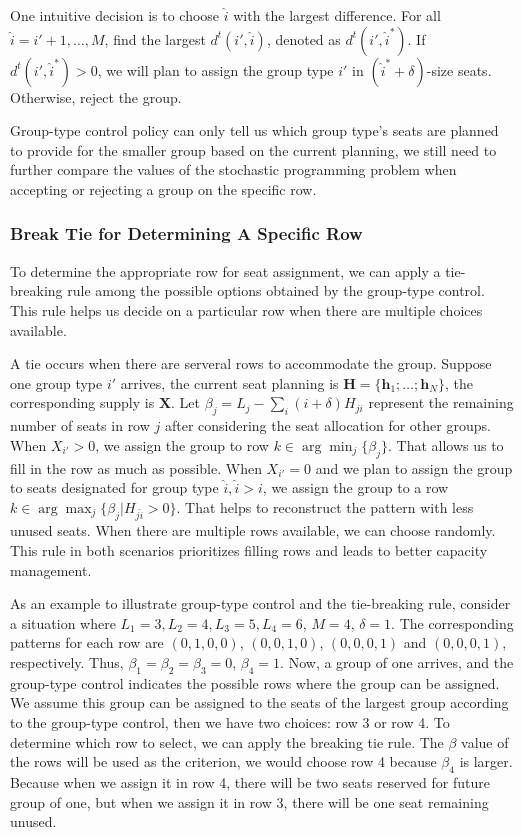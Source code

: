 One intuitive decision is to choose $\hat{i}$ with the largest difference. For all $\hat{i} = {i{'}}+1, \ldots, M$, find the largest $d^{t}({i{'}},\hat{i})$, denoted as $d^{t}({i{'}},\hat{i}^{*})$. If $d^{t}({i{'}},\hat{i}^{*}) >0$, we will plan to assign the group type ${i{'}}$ in $(\hat{i}^{*}+\delta)$-size seats. Otherwise, reject the group.

Group-type control policy can only tell us which group type's seats are planned to provide for the smaller group based on the current planning, we still need to further compare the values of the stochastic programming problem when accepting or rejecting a group on the specific row. 

\subsubsection{Break Tie for Determining A Specific Row}\label{tie-break}
To determine the appropriate row for seat assignment, we can apply a tie-breaking rule among the possible options obtained by the group-type control. This rule helps us decide on a particular row when there are multiple choices available.

A tie occurs when there are serveral rows to accommodate the group. Suppose one group type ${i{'}}$ arrives, the current seat planning is $\bm{H} = \{\bm{h}_{1}; \ldots; \bm{h}_{N}\}$, the corresponding supply is $\bm{X}$. Let $\beta_{j} = L_j - \sum_{i} (i+\delta) H_{ji}$ represent the remaining number of seats in row $j$ after considering the seat allocation for other groups. When $X_{{i{'}}} > 0$, we assign the group to row $k \in \arg \min_{j} \{\beta_{j}\}$. That allows us to fill in the row as much as possible. When $X_{{i{'}}} = 0$ and we plan to assign the group to seats designated for group type $\hat{i}, \hat{i}>i$, we assign the group to a row $k \in \arg \max_{j} \{\beta_{j}| H_{j \hat{i}}>0\}$. That helps to reconstruct the pattern with less unused seats. When there are multiple rows available, we can choose randomly. This rule in both scenarios prioritizes filling rows and leads to better capacity management.

As an example to illustrate group-type control and the tie-breaking rule, consider a situation where $L_1 =3, L_2 = 4, L_3 =5, L_4 =6$, $M =4$, $\delta =1$. The corresponding patterns for each row are $(0,1,0,0)$, $(0,0,1,0)$, $(0,0,0,1)$ and $(0,0,0,1)$, respectively. Thus, $\beta_1 = \beta_2 = \beta_3 =0$, $\beta_4 =1$. Now, a group of one arrives, and the group-type control indicates the possible rows where the group can be assigned. We assume this group can be assigned to the seats of the largest group according to the group-type control, then we have two choices: row 3 or row 4. To determine which row to select, we can apply the breaking tie rule. The $\beta$ value of the rows will be used as the criterion, we would choose row 4 because $\beta_4$ is larger. Because when we assign it in row 4, there will be two seats reserved for future group of one, but when we assign it in row 3, there will be one seat remaining unused.

